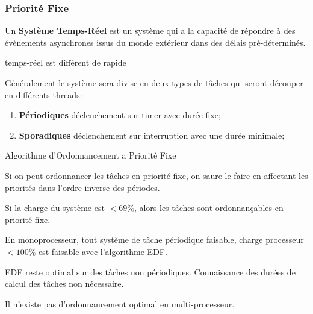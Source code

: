 \documentclass{article}
\begin{document}
\subsubsection{Priorité Fixe}
\begin{definition}
    Un \textbf{Système Temps-Réel} est un système qui a la capacité de répondre à des évènements asynchrones issus du monde extérieur dans des délais pré-déterminés.
    \begin{phrase}
        temps-réel est différent de rapide
    \end{phrase}
    Généralement le système sera divise en deux types de tâches qui seront découper en différents threads:
    \begin{enumerate}[noitemsep]
        \item \textbf{Périodiques} déclenchement sur timer avec durée fixe;
        \item \textbf{Sporadiques} déclenchement sur interruption avec une durée minimale;
    \end{enumerate}
\end{definition}
\begin{definition}
    Algorithme d'Ordonnancement a Priorité Fixe
    \begin{theorem}
        Si on peut ordonnancer les tâches en priorité fixe, on saure le faire en affectant les priorités dans l'ordre inverse des périodes.
    \end{theorem}

    \begin{theorem}
        Si la charge du système est $<69\%$, alors les tâches sont ordonnançables en priorité fixe.
    \end{theorem}

    \begin{theorem}
        En monoprocesseur, tout système de tâche périodique faisable, charge processeur $<100\%$ est faisable avec l'algorithme EDF.

        \begin{remark}
            EDF reste optimal sur des tâches non périodiques. Connaissance des durées de calcul des tâches non nécessaire.
        \end{remark}

        \begin{phrase}
            Il n'existe pas d'ordonnancement optimal en multi-processeur.
        \end{phrase}
    \end{theorem}
\end{definition}
\end{document}

